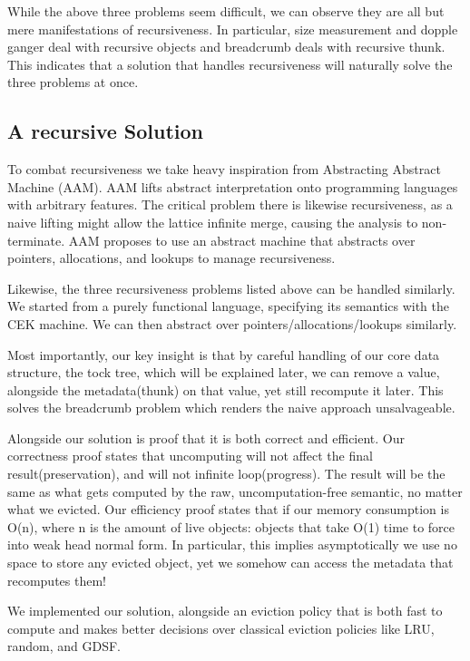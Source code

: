 While the above three problems seem difficult, we can observe they are all but mere manifestations of recursiveness. In particular, size measurement and dopple ganger deal with recursive objects and breadcrumb deals with recursive thunk. This indicates that a solution that handles recursiveness will naturally solve the three problems at once.

\subsection{A recursive Solution}
To combat recursiveness we take heavy inspiration from Abstracting Abstract Machine (AAM). AAM lifts abstract interpretation onto programming languages with arbitrary features. The critical problem there is likewise recursiveness, as a naive lifting might allow the lattice infinite merge, causing the analysis to non-terminate. AAM proposes to use an abstract machine that abstracts over pointers, allocations, and lookups to manage recursiveness.

Likewise, the three recursiveness problems listed above can be handled similarly. We started from a purely functional language, specifying its semantics with the CEK machine. We can then abstract over pointers/allocations/lookups similarly.

Most importantly, our key insight is that by careful handling of our core data structure, the tock tree, which will be explained later, we can remove a value, alongside the metadata(thunk) on that value, yet still recompute it later. This solves the breadcrumb problem which renders the naive approach unsalvageable.

Alongside our solution is proof that it is both correct and efficient. Our correctness proof states that uncomputing will not affect the final result(preservation), and will not infinite loop(progress). The result will be the same as what gets computed by the raw, uncomputation-free semantic, no matter what we evicted. Our efficiency proof states that if our memory consumption is O(n), where n is the amount of live objects: objects that take O(1) time to force into weak head normal form. In particular, this implies asymptotically we use no space to store any evicted object, yet we somehow can access the metadata that recomputes them!

We implemented our solution, alongside an eviction policy that is both fast to compute and makes better decisions over classical eviction policies like LRU, random, and GDSF.
